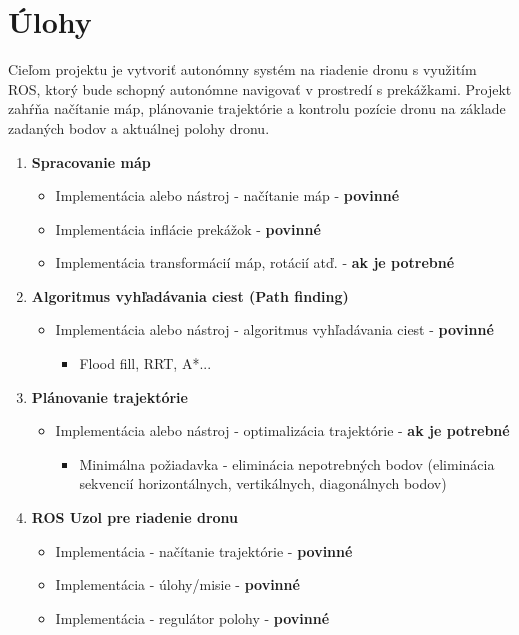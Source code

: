 
\section{Úlohy}
Cieľom projektu je vytvoriť autonómny systém na riadenie dronu s využitím ROS, ktorý bude schopný autonómne navigovať v prostredí s prekážkami. Projekt zahŕňa načítanie máp, plánovanie trajektórie a kontrolu pozície dronu na základe zadaných bodov a aktuálnej polohy dronu.
\begin{enumerate}
    \item \textbf{Spracovanie máp}
    \begin{itemize}
        \item Implementácia alebo nástroj - načítanie máp - \textbf{povinné}
        \item Implementácia inflácie prekážok - \textbf{povinné}
        \item Implementácia transformácií máp, rotácií atď. - \textbf{ak je potrebné}
    \end{itemize}
    
    \item \textbf{Algoritmus vyhľadávania ciest (Path finding)}
    \begin{itemize}
        \item Implementácia alebo nástroj - algoritmus vyhľadávania ciest - \textbf{povinné}
        \begin{itemize}
            \item Flood fill, RRT, A*...
        \end{itemize}
    \end{itemize}
    
    \item \textbf{Plánovanie trajektórie}
    \begin{itemize}
        \item Implementácia alebo nástroj - optimalizácia trajektórie - \textbf{ak je potrebné}
        \begin{itemize}
            \item Minimálna požiadavka - eliminácia nepotrebných bodov (eliminácia sekvencií horizontálnych, vertikálnych, diagonálnych bodov)
        \end{itemize}
    \end{itemize}
    
    \item \textbf{ROS Uzol pre riadenie dronu}
    \begin{itemize}
        \item Implementácia - načítanie trajektórie - \textbf{povinné}
        \item Implementácia - úlohy/misie - \textbf{povinné}
        \item Implementácia - regulátor polohy - \textbf{povinné}
    \end{itemize}
    

\end{enumerate}
